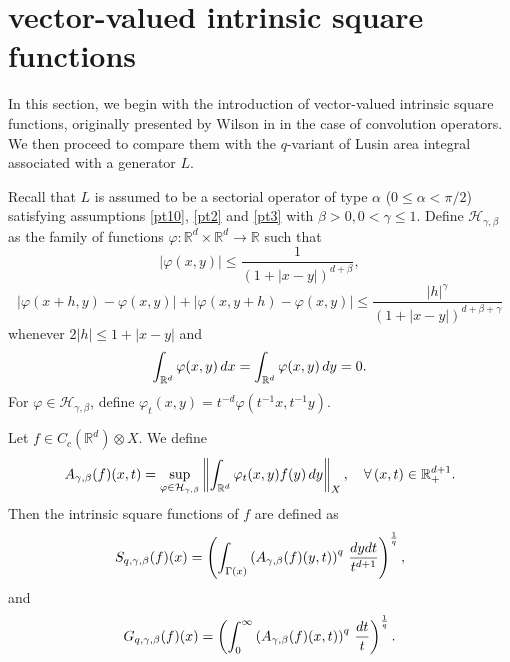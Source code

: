 \documentclass[oneside,english,a4wide]{amsart}
\numberwithin{equation}{section}
\numberwithin{figure}{section}
\theoremstyle{plain}
\theoremstyle{plain}
\theoremstyle{definition}
\theoremstyle{plain}
\theoremstyle{remark}
\theoremstyle{definition}
\theoremstyle{remark}
\theoremstyle{definition}
\newcommand{\real}{{\mathbb R}}
\newcommand{\f}{\varphi}
\newcommand{\ot}{\otimes}
\newcommand{\8}{+\infty}
\renewcommand{\1}{\mathbbm{1}}
\newcommand{\wh}{\widehat}
\newcommand\norm[1]{ \left\| #1 \right\| }
\newcommand\sk[1]{ \left( #1 \right) }
\renewcommand\d{{\rm d}}
\begin{document}
{%



\section{vector-valued intrinsic square functions}
In this section, we begin with the introduction of vector-valued intrinsic square functions, originally presented by Wilson in \cite{Wilson2008} in the case of convolution operators. We then proceed to compare them with the $q$-variant of Lusin area integral associated with a generator $L$.%

Recall that $L$ is assumed to be a sectorial operator of type $\alpha$ ($0 \leq \alpha < \pi/2$) satisfying assumptions \eqref{pt10}, \eqref{pt2} and \eqref{pt3} with $ \beta > 0, 0 < \gamma \leq 1$. Define $ \mathcal{H}_{\gamma,\beta} $ as the family of functions $ \f : \real^d \times \real^d \to \real $ such that
\begin{equation}\label{Nicef1}
  |\f(x,y)| \leq \frac{1}{(1 + |x-y|)^{d+\beta}},
\end{equation}
\begin{equation}\label{Nicef2}
  | \f(x+h,y) - \f(x,y) | + | \f(x,y+h) - \f(x,y) | \leq \frac{|h|^\gamma  }{(1 + |x-y|)^{d+\beta+\gamma}}
\end{equation}
whenever $ 2|h| \leq 1 + |x-y| $ and
\begin{equation}\label{Nicef3}
  \int_{\real^d} \f(x,y)\,\d x = \int_{\real^d} \f(x,y)\,\d y = 0.
\end{equation}
For $\f\in \mathcal{H}_{\gamma,\beta} $, define $ \f_t(x,y) = t^{-d}\f(t^{-1}x,t^{-1}y) $.

Let $ f \in C_c(\real^d) \ot X$. We define
\[
    A_{\gamma,\beta} (f)(x,t) = \sup_{\f \in \mathcal{H}_{\gamma,\beta} } \norm{ \int_{\real^d} \f_t(x,y)f(y)\,\d y }_X, \quad \forall\, (x, t) \in \real^{d + 1}_+.
\]
Then the intrinsic square functions of $f$ are defined as
\[
S_{q,\gamma,\beta}(f)(x) = \sk{ \int_{\Gamma(x)} \sk{A_{\gamma,\beta}(f)(y,t)}^q \,\frac{\d y\d t}{t^{d+1}}  }^{\frac{1}{q}},
\]
and
\[
G_{q,\gamma,\beta}(f)(x) = \sk{ \int_{0}^{\infty} \sk{A_{\gamma,\beta}(f)(x,t)}^q \,\frac{\d t}{t}  }^{\frac{1}{q}}.
\]

}
\end{document}
